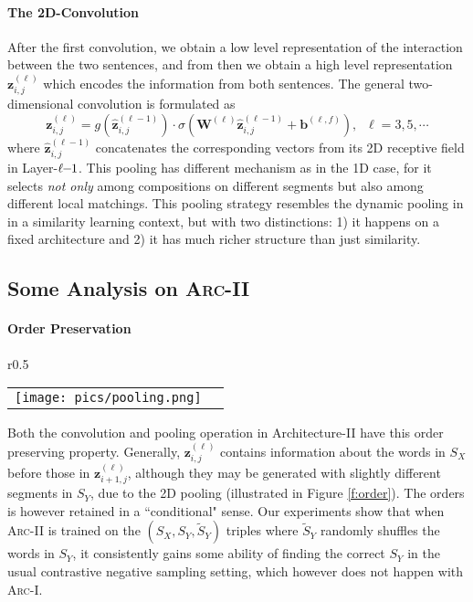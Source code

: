 \documentclass{article} \usepackage{nips14submit_e,times}
\newcommand{\W}{\ensuremath{\mathbf{W}}}
\renewcommand{\b}{\ensuremath{\mathbf{b}}}
\newcommand{\z}{\ensuremath{\mathbf{z}}}
\newcommand{\0}{\ensuremath{\mathbf{0}}}
\newcommand{\1}{\ensuremath{\mathbf{1}}}
\begin{document}
\paragraph{The 2D-Convolution} After the first convolution, we obtain a low level representation of the interaction between the two sentences, and from then we obtain a high level representation $\z^{(\ell )}_{i,j}$ which encodes the information from both sentences. The general two-dimensional convolution is formulated as
\begin{equation}
\z^{(\ell)}_{i,j} =  g(\hat{\mathbf{z}}^{(\ell-1)}_{i,j})\cdot \sigma(\W^{(\ell)} \hat{\mathbf{z}}^{(\ell-1)}_{i,j} + \b^{(\ell,f)}), \;\;\ell = 3,5,\cdots
\end{equation}
where $ \hat{\mathbf{z}}^{(\ell-1)}_{i,j}$ concatenates the corresponding vectors from its 2D receptive field in Layer-$\ell\hspace{-3pt}-\hspace{-3pt}1$. This pooling has different mechanism as in the 1D case, for it selects \emph{not only} among compositions on different segments but also among different local matchings. This pooling strategy resembles the dynamic pooling in \cite{socher2011} in a similarity learning context, but with two distinctions: 1) it happens on a fixed architecture and 2) it has much richer structure than just similarity.


\subsection{Some Analysis on \textsc{Arc-II}}\vspace{-5pt}
\paragraph{Order Preservation}
\begin{wrapfigure}{r}{0.5\textwidth}
\begin{center}
\begin{tabular}[c]{cc}
     \texttt{[image: pics/pooling.png]} \end{tabular}
\caption{Order preserving in 2D-pooling.} \label{f:order}
  \end{center}
\vspace{-10pt}
\end{wrapfigure}

Both the convolution and pooling operation in Architecture-II have this order preserving property. Generally, $\z^{(\ell)}_{i,j}$ contains information about the words in $S_X$ before those in $\z^{(\ell)}_{i+1,j}$,  although they may be generated with slightly different segments in $S_Y$, due to the 2D pooling (illustrated in Figure \ref{f:order}). The orders is however retained in a ``conditional" sense. Our experiments show that when \textsc{Arc-II} is trained on the $(S_X, S_Y, \tilde{S}_Y)$ triples where $\tilde{S}_Y$ randomly shuffles the words in $S_Y$, it consistently gains some ability of finding the correct $S_Y$ in the usual contrastive negative sampling setting, which however does not happen with \textsc{Arc-I}. \vspace{-5pt}
\end{document}
